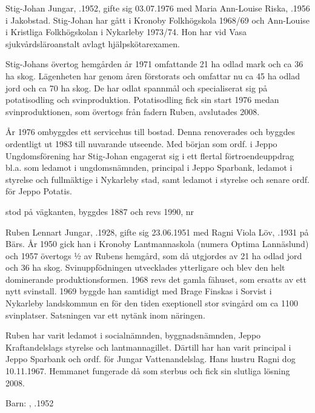 
Stig-Johan Jungar, .1952, gifte sig 03.07.1976 med Maria Ann-Louise Riska, .1956 i Jakobstad. Stig-Johan har gått i Kronoby Folkhögskola 1968/69 och Ann-Louise i Kristliga Folkhögskolan i Nykarleby 1973/74. Hon har vid Vasa sjukvårdsläroanstalt avlagt hjälpskötarexamen.

Stig-Johans övertog hemgården år 1971 omfattande 21 ha odlad mark och ca 36 ha skog. Lägenheten har genom åren förstorats och omfattar nu ca 45 ha odlad jord och ca 70 ha skog. De har odlat spannmål och specialiserat sig på potatisodling och svinproduktion.  Potatisodling fick sin start 1976 medan svinproduktionen, som övertogs från fadern Ruben, avslutades 2008.

År 1976 ombyggdes ett servicehus till bostad. Denna renoverades och byggdes ordentligt ut 1983 till nuvarande utseende. Med början som ordf. i Jeppo Ungdomsförening har Stig-Johan engagerat sig i ett flertal förtroendeuppdrag bl.a. som ledamot i ungdomsnämnden, principal i Jeppo Sparbank, ledamot i styrelse och fullmäktige i Nykarleby stad, samt ledamot i styrelse och senare ordf. för Jeppo Potatis.


 stod på vägkanten, byggdes 1887 och revs 1990, nr 


Ruben Lennart Jungar, .1928, gifte sig 23.06.1951 med Ragni Viola Löv, .1931 på Bärs. År 1950 gick han i Kronoby Lantmannaskola (numera Optima Lannäslund) och 1957 övertogs ½ av Rubens hemgård, som då utgjordes av 21 ha odlad jord och 36 ha skog. Svinuppfödningen utvecklades ytterligare och blev den helt dominerande produktionsformen. 1968 revs det gamla fähuset, som ersatts av ett nytt svinstall. 1969 byggde han samtidigt med Brage Finskas i Sorvist i Nykarleby landskommun en för den tiden exeptionell stor svingård om ca 1100 svinplatser. Satsningen var ett nytänk inom näringen.

Ruben har varit ledamot i socialnämnden, byggnadsnämnden, Jeppo Kraftandelslags styrelse och lantmannagillet. Därtill har han varit principal i Jeppo Sparbank och ordf. för Jungar Vattenandelslag. Hans hustru Ragni dog 10.11.1967. Hemmanet fungerade då som sterbus och fick sin slutliga lösning 2008.

Barn: , .1952

